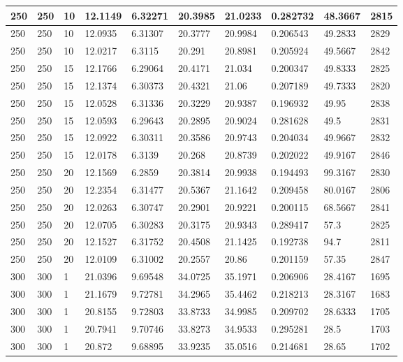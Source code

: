 \begin{landscape}
\begin{longtable}{ | l | l | l | l | l | l | l | l | l | l | }
250 & 250 & 10 & 12.1149 & 6.32271 & 20.3985 & 21.0233 & 0.282732 & 48.3667 & 2815\\ \hline
250 & 250 & 10 & 12.0935 & 6.31307 & 20.3777 & 20.9984 & 0.206543 & 49.2833 & 2829\\ \hline
250 & 250 & 10 & 12.0217 & 6.3115 & 20.291 & 20.8981 & 0.205924 & 49.5667 & 2842\\ \hline
250 & 250 & 15 & 12.1766 & 6.29064 & 20.4171 & 21.034 & 0.200347 & 49.8333 & 2825\\ \hline
250 & 250 & 15 & 12.1374 & 6.30373 & 20.4321 & 21.06 & 0.207189 & 49.7333 & 2820\\ \hline
250 & 250 & 15 & 12.0528 & 6.31336 & 20.3229 & 20.9387 & 0.196932 & 49.95 & 2838\\ \hline
250 & 250 & 15 & 12.0593 & 6.29643 & 20.2895 & 20.9024 & 0.281628 & 49.5 & 2831\\ \hline
250 & 250 & 15 & 12.0922 & 6.30311 & 20.3586 & 20.9743 & 0.204034 & 49.9667 & 2832\\ \hline
250 & 250 & 15 & 12.0178 & 6.3139 & 20.268 & 20.8739 & 0.202022 & 49.9167 & 2846\\ \hline
250 & 250 & 20 & 12.1569 & 6.2859 & 20.3814 & 20.9938 & 0.194493 & 99.3167 & 2830\\ \hline
250 & 250 & 20 & 12.2354 & 6.31477 & 20.5367 & 21.1642 & 0.209458 & 80.0167 & 2806\\ \hline
250 & 250 & 20 & 12.0263 & 6.30747 & 20.2901 & 20.9221 & 0.200115 & 68.5667 & 2841\\ \hline
250 & 250 & 20 & 12.0705 & 6.30283 & 20.3175 & 20.9343 & 0.289417 & 57.3 & 2825\\ \hline
250 & 250 & 20 & 12.1527 & 6.31752 & 20.4508 & 21.1425 & 0.192738 & 94.7 & 2811\\ \hline
250 & 250 & 20 & 12.0109 & 6.31002 & 20.2557 & 20.86 & 0.201159 & 57.35 & 2847\\ \hline
300 & 300 & 1 & 21.0396 & 9.69548 & 34.0725 & 35.1971 & 0.206906 & 28.4167 & 1695\\ \hline
300 & 300 & 1 & 21.1679 & 9.72781 & 34.2965 & 35.4462 & 0.218213 & 28.3167 & 1683\\ \hline
300 & 300 & 1 & 20.8155 & 9.72803 & 33.8733 & 34.9985 & 0.209702 & 28.6333 & 1705\\ \hline
300 & 300 & 1 & 20.7941 & 9.70746 & 33.8273 & 34.9533 & 0.295281 & 28.5 & 1703\\ \hline
300 & 300 & 1 & 20.872 & 9.68895 & 33.9235 & 35.0516 & 0.214681 & 28.65 & 1702\\ \hline

\end{longtable}
\end{landscape}
